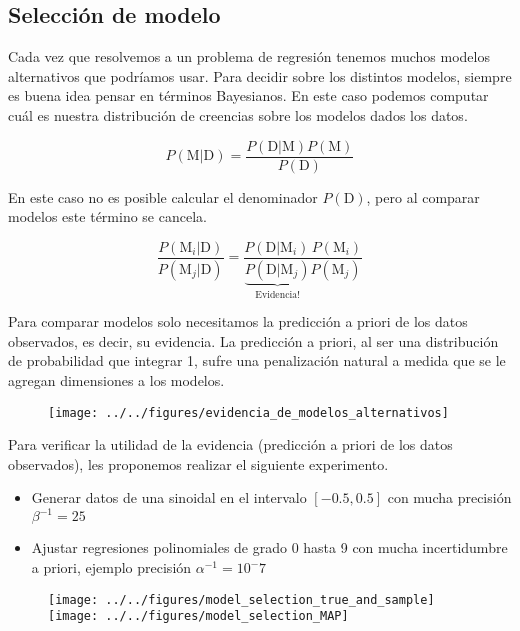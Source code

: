 \subsection{Selecci\'on de modelo}\label{ssec:seleccion}

Cada vez que resolvemos a un problema de regresi\'on tenemos muchos modelos alternativos que podr\'iamos usar.
Para decidir sobre los distintos modelos, siempre es buena idea pensar en t\'erminos Bayesianos.
En este caso podemos computar cu\'al es nuestra distribuci\'on de creencias sobre los modelos dados los datos.

\begin{equation*}
 P(\text{M}|\text{D}) = \frac{P(\text{D}|\text{M})P(\text{M})}{ P(\text{D})}
\end{equation*}

En este caso no es posible calcular el denominador $P(\text{D})$, pero al comparar modelos este t\'ermino se cancela.

\begin{equation*}
  \frac{P(\text{M}_i|\text{D})}{P(\text{M}_j|\text{D})}  = \frac{P(\text{D}|\text{M}_i)\,P(\text{M}_i)}{ \underbrace{P(\text{D}|\text{M}_j)}_{\text{Evidencia!}}P(\text{M}_j)}  
\end{equation*}

Para comparar modelos solo necesitamos la predicci\'on a priori de los datos observados, es decir, su evidencia.
La predicci\'on a priori, al ser una distribuci\'on de probabilidad que integrar 1, sufre una penalizaci\'on natural a medida que se le agregan dimensiones a los modelos.

\begin{figure}[H]
\centering
  \texttt{[image: ../../figures/evidencia\_de\_modelos\_alternativos]} 
\end{figure}

Para verificar la utilidad de la evidencia (predicci\'on a priori de los datos observados), les proponemos realizar el siguiente experimento.

\begin{itemize}
  \item Generar datos de una sinoidal en el intervalo $[-0.5,0.5]$ con mucha precisi\'on $\beta^{-1} =25$
 \item Ajustar regresiones polinomiales de grado 0 hasta 9 con mucha incertidumbre a priori, ejemplo precisi\'on $\alpha^{-1}=10^-{7}$
\end{itemize}

\begin{figure}[H]
\centering
 \texttt{[image: ../../figures/model\_selection\_true\_and\_sample]} 
 \texttt{[image: ../../figures/model\_selection\_MAP]} 
\end{figure}

